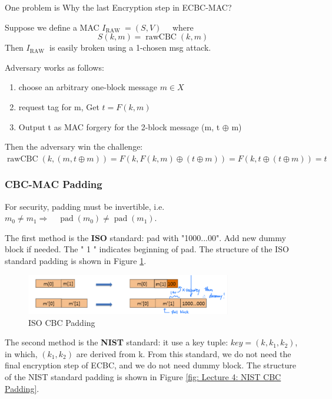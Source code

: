 One problem is Why the last Encryption step in ECBC-MAC?

Suppose we define a MAC $I_{\text {RAW }}=(S, V) \quad$ where
$$
S(k, m)=\operatorname{rawCBC}(k, m)
$$
Then $I_{\text {RAW }}$ is easily broken using a 1-chosen msg attack.

Adversary works as follows:
\begin{enumerate} [itemsep=2pt,topsep=0pt,parsep=0pt]
    \item choose an arbitrary one-block message $m \in X$
    \item request tag for m, Get $t=F(k,m)$
    \item Output t as MAC forgery for the 2-block message (m, t $\oplus$ m)
\end{enumerate}


Then the adversary win the challenge: $\operatorname{rawCBC}(k,(m, t \oplus m))=F(k, F(k, m) \oplus(t \oplus m))=F(k, t \oplus(t \oplus m))=t$

\subsubsection{CBC-MAC Padding}

For security, padding must be invertible, i.e.  $m_{0} \neq m_{1} \Rightarrow \quad \operatorname{pad}\left(m_{0}\right) \neq \operatorname{pad}\left(m_{1}\right)$.

The first method is the \textbf{ISO} standard: pad with "1000...00". Add new dummy block if needed. The " 1 " indicates beginning of pad. The structure of the ISO standard padding is shown in Figure \ref{fig: Lecture 4: ISO CBC Padding}.


\begin{figure}[h]
    \centering
    \includegraphics[width=0.8\textwidth]{Stanford_Crypto_1/fig/04_Integrity/ISO CBC Padding.png}
    \caption{ISO CBC Padding}
    \label{fig: Lecture 4: ISO CBC Padding}
\end{figure}


The second method is the \textbf{NIST} standard: it use a key tuple: $key=(k,k_1,k_2)$, in which, $(k_1,k_2)$ are derived from k. From this standard, we do not need the final encryption step of ECBC, and we do not need dummy block. The structure of the NIST standard padding is shown in Figure \ref{fig: Lecture 4: NIST CBC Padding}.

